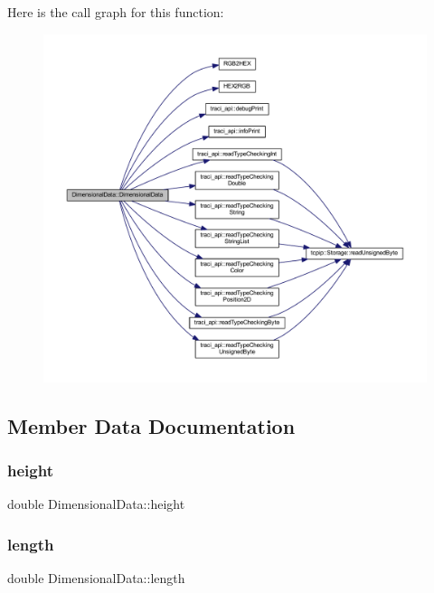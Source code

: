 Here is the call graph for this function\+:\nopagebreak
\begin{figure}[H]
\begin{center}
\leavevmode
\includegraphics[width=350pt]{class_dimensional_data_a85c1d983a7dbe67ed9d93336e37b2b74_cgraph}
\end{center}
\end{figure}


\subsection{Member Data Documentation}
\mbox{\label{class_dimensional_data_ad5deedd58ab9d79954d33780f0e2fce2}} 
\subsubsection{\texorpdfstring{height}{height}}
{\footnotesize\ttfamily double Dimensional\+Data\+::height}

\mbox{\label{class_dimensional_data_a07f712bbdabdc7cadc671feb480065a4}} 
\subsubsection{\texorpdfstring{length}{length}}
{\footnotesize\ttfamily double Dimensional\+Data\+::length}


